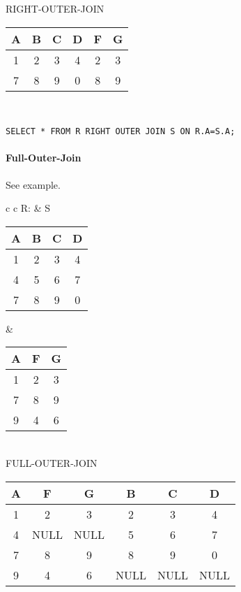 RIGHT-OUTER-JOIN\\
\begin{tabular}{|c|c|c|c|c|c|}
	\hline
	A & B & C & D & F & G\\
	\hline
	1 & 2 & 3 & 4 & 2 & 3\\
	\hline
	7 & 8 & 9 & 0 & 8 & 9\\
	\hline
\end{tabular}\\

\lstset{language=SQL,tabsize=4,captionpos=b,frame=single,
basicstyle=\footnotesize}
\begin{lstlisting}[caption=Right-Outer-Join]
SELECT * FROM R RIGHT OUTER JOIN S ON R.A=S.A;
\end{lstlisting}

\paragraph{Full-Outer-Join} See example.\\
\begin{tabular}{ c c}
	R: & S\\
	\begin{tabular}{|c|c|c|c|}
		\hline
		A & B & C & D\\
		\hline
		1 & 2 & 3 & 4\\
		\hline
		4 & 5 & 6 & 7\\
		\hline
		7 & 8 & 9 & 0\\
		\hline
	\end{tabular} &

	\begin{tabular}{|c|c|c|}
		\hline
		A & F & G \\
		\hline
		1 & 2 & 3\\
		\hline
		7 & 8 & 9\\
		\hline
		9 & 4 & 6\\
		\hline
	\end{tabular}
\end{tabular}\\

FULL-OUTER-JOIN\\
\begin{tabular}{|c|c|c|c|c|c|}
	\hline
	A & F & G & B & C & D\\
	\hline
	1 & 2 & 3 & 2 & 3 & 4\\
	\hline
	4 & NULL & NULL & 5 & 6 & 7\\
	\hline
	7 & 8 & 9 & 8 & 9 & 0\\
	\hline
	9 & 4 & 6 & NULL & NULL & NULL\\
	\hline
\end{tabular}\\

